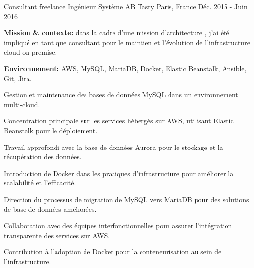 \begin{cventries}
\cventry
{Consultant freelance Ingénieur Système} %
{AB Tasty} %
{Paris, France} %
{Déc. 2015 - Juin 2016} %
{
  \begin{cvitems} %
    \item {\textbf{Mission \& contexte:} dans la cadre d'une mission d'architecture , j'ai été impliqué en tant que consultant pour le maintien et l'évolution de l'infrastructure cloud on premise.}
    \item {\textbf{Environnement:} AWS, MySQL, MariaDB, Docker, Elastic Beanstalk, Ansible, Git, Jira.}
    \item {Gestion et maintenance des bases de données MySQL dans un environnement multi-cloud.}
    \item {Concentration principale sur les services hébergés sur AWS, utilisant Elastic Beanstalk pour le déploiement.}
    \item {Travail approfondi avec la base de données Aurora pour le stockage et la récupération des données.}
    \item {Introduction de Docker dans les pratiques d'infrastructure pour améliorer la scalabilité et l'efficacité.}
    \item {Direction du processus de migration de MySQL vers MariaDB pour des solutions de base de données améliorées.}
    \item {Collaboration avec des équipes interfonctionnelles pour assurer l'intégration transparente des services sur AWS.}
    \item {Contribution à l'adoption de Docker pour la conteneurisation au sein de l'infrastructure.}
  \end{cvitems}
}


\end{cventries}

